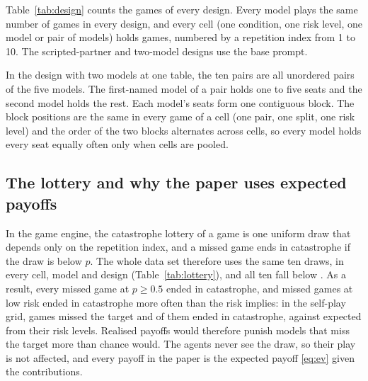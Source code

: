 \documentclass[10pt]{article}
\let\plainsubsection\subsection
\renewcommand{\subsection}{\FloatBarrier\needspace{8\baselineskip}\plainsubsection}
\begin{document}
Table~\ref{tab:design} counts the games of every design. Every model plays the same number of games in every design, and every cell (one condition, one risk level, one model or pair of models) holds \CntReps{} games, numbered by a repetition index from 1 to 10. The scripted-partner and two-model designs use the base prompt.

\begin{table}[h]
\caption{Games per design. \emph{Games per model} counts the games in which a model holds at least one seat; in the design with two models at one table each model sits in four of the ten pairs. \emph{Model decisions} counts one decision per model seat per round (the scripted seats are not counted). \emph{Without the marker}: replies with no \texttt{CONTRIBUTION:} line, whose move was read from the rest of the reply (Section~\ref{sec:parse}); no reply was unreadable.}
\label{tab:design}
\centering\small

\end{table}

In the design with two models at one table, the ten pairs are all unordered pairs of the five models. The first-named model of a pair holds one to five seats and the second model holds the rest. Each model's seats form one contiguous block. The block positions are the same in every game of a cell (one pair, one split, one risk level) and the order of the two blocks alternates across cells, so every model holds every seat equally often only when cells are pooled.

\subsection{The lottery and why the paper uses expected payoffs}
\label{sec:lottery}

In the game engine, the catastrophe lottery of a game is one uniform draw that depends only on the repetition index, and a missed game ends in catastrophe if the draw is below $p$. The whole data set therefore uses the same ten draws, in every cell, model and design (Table~\ref{tab:lottery}), and all ten fall below \LotMaxDraw{}. As a result, every missed game at $p\ge0.5$ ended in catastrophe, and missed games at low risk ended in catastrophe more often than the risk implies: in the self-play grid, \SupLotMissed{} games missed the target and \LotRealCat{} of them ended in catastrophe, against \LotExpCat{} expected from their risk levels. Realised payoffs would therefore punish models that miss the target more than chance would. The agents never see the draw, so their play is not affected, and every payoff in the paper is the expected payoff \eqref{eq:ev} given the contributions.
\end{document}
